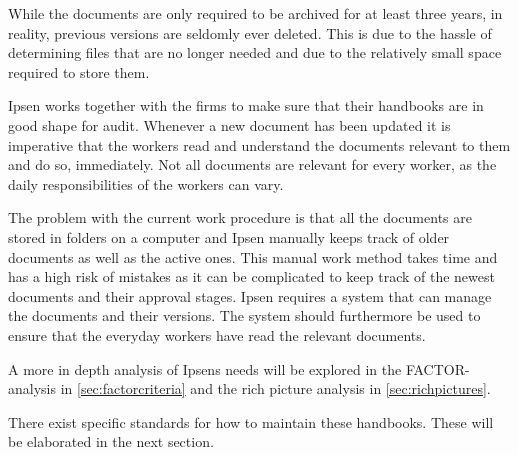While the documents are only required to be archived for at least three years, in reality, previous versions are seldomly ever deleted.
This is due to the hassle of determining files that are no longer needed and due to the relatively small space required to store them.

Ipsen works together with the firms to make sure that their handbooks are in good shape for audit.
Whenever a new document has been updated it is imperative that the workers read and understand the documents relevant to them and do so, immediately.
Not all documents are relevant for every worker, as the daily responsibilities of the workers can vary.

The problem with the current work procedure is that all the documents are stored in folders on a computer and Ipsen manually keeps track of older documents as well as the active ones.
This manual work method takes time and has a high risk of mistakes as it can be complicated to keep track of the newest documents and their approval stages.
Ipsen requires a system that can manage the documents and their versions.
The system should furthermore be used to ensure that the everyday workers have read the relevant documents.

A more in depth analysis of Ipsens needs will be explored in the FACTOR-analysis in \cref{sec:factorcriteria} and the rich picture analysis in \cref{sec:richpictures}.

There exist specific standards for how to maintain these handbooks.
These will be elaborated in the next section.
